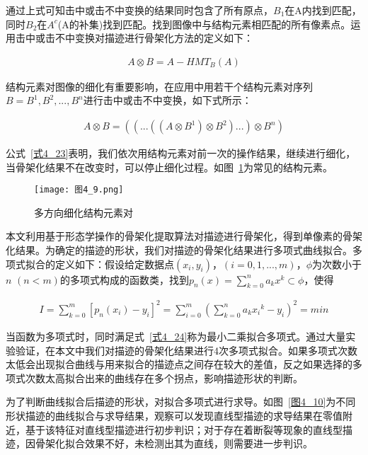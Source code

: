 通过上式可知击中或击不中变换的结果同时包含了所有原点，$B_{1}$在A内找到匹配，同时$B_{2}$在$A^{c}$(A的补集)找到匹配。找到图像中与结构元素相匹配的所有像素点。运用击中或击不中变换对描迹进行骨架化方法的定义如下：
\begin{linenomath}
\begin{align}
A \otimes B =A-{HMT}_{B}(A)
\label{式4_22}
\end{align}
\end{linenomath}
 
结构元素对图像的细化有重要影响，在应用中用若干个结构元素对序列${B}={B^{1}, B^{2},...,B^{n}}$进行击中或击不中变换，如下式所示：
\begin{linenomath}
\begin{align}
A \otimes {B}=((...((A \otimes B^{1})\otimes B^{2})...) \otimes {B^{n}})
\label{式4_23}
\end{align}
\end{linenomath} 
  
公式~\ref{式4_23}表明，我们依次用结构元素对前一次的操作结果，继续进行细化，当骨架化结果不在改变时，可以停止细化过程。如图~\ref{图4_9}为常见的结构元素。
 
\begin{figure}[!ht]
\centering
\texttt{[image: 图4\_9.png]}
\caption{多方向细化结构元素对}
\label{图4_9}
\end{figure}

本文利用基于形态学操作的骨架化提取算法对描迹进行骨架化，得到单像素的骨架化结果。为确定的描迹的形状，我们对描迹的骨架化结果进行多项式曲线拟合。多项式拟合的定义如下：假设给定数据点$(x_{i},y_{i})$，$(i=0,1,...,m)$，$\phi$为次数小于$n$ $(n<m)$的多项式构成的函数类，找到$p_{n}(x)={\sum}_{k=0}^{n}a_{k}x^{k}\subset \phi$，使得
\begin{linenomath}
\begin{align}
I={\sum}_{k=0}^{m}[p_{n}(x_{i})-y_{i}]^{2}={\sum}_{i=0}^{m}{({\sum}_{k=0}^{n}a_{k}{x_{i}}^{k}-y_{i})}^{2}=min
\label{式4_24}
\end{align}
\end{linenomath} 

 当函数为多项式时，同时满足式~\ref{式4_24}称为最小二乘拟合多项式。通过大量实验验证，在本文中我们对描迹的骨架化结果进行4次多项式拟合。如果多项式次数太低会出现拟合曲线与用来拟合的描迹点之间存在较大的差值，反之如果选择的多项式次数太高拟合出来的曲线存在多个拐点，影响描迹形状的判断。
 
为了判断曲线拟合后描迹的形状，对拟合多项式进行求导。如图~\ref{图4_10}为不同形状描迹的曲线拟合与求导结果，观察可以发现直线型描迹的求导结果在零值附近，基于该特征对直线型描迹进行初步判识；对于存在着断裂等现象的直线型描迹，因骨架化拟合效果不好，未检测出其为直线，则需要进一步判识。
 

